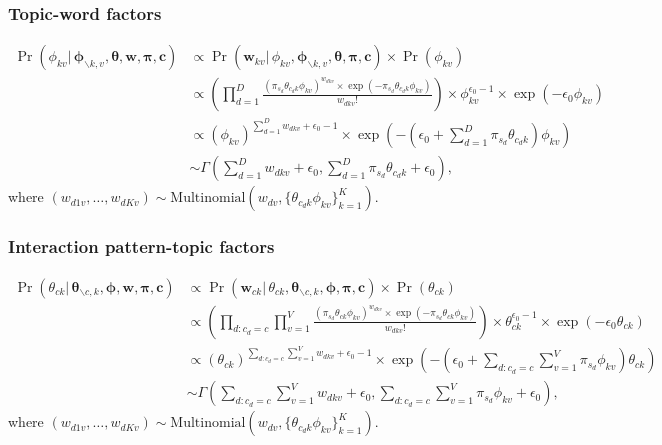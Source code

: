 \documentclass[ba]{imsart}
\numberwithin{equation}{section}
\theoremstyle{plain}
\begin{document}
				\subsubsection{Topic-word factors}
				\begin{equation}
				\begin{aligned}
				\Pr(\phi_{kv}|\,\boldsymbol{\phi}_{\backslash k,v},\boldsymbol{\theta},\boldsymbol{w},\boldsymbol{\pi},\boldsymbol{c}) & \propto \Pr(\boldsymbol{w}_{kv}|\,\phi_{kv},\boldsymbol{\phi}_{\backslash k,v},\boldsymbol{\theta},\boldsymbol{\pi},\boldsymbol{c}) \times \Pr(\phi_{kv})\\
				& \propto (\prod_{d=1}^D \frac{(\pi_{s_d} \theta_{c_dk}\phi_{kv})^{w_{dkv}}\times \exp(-\pi_{s_d} \theta_{c_dk}\phi_{kv})}{w_{dkv}!} )\times \phi_{kv}^{\epsilon_0-1} \times \exp(-\epsilon_0 \phi_{kv})\\
				&\propto (\phi_{kv})^{\sum_{d=1}^D w_{dkv}+\epsilon_0-1}\times \exp(-(\epsilon_0 +\sum_{d=1}^D\pi_{s_d} \theta_{c_dk})\phi_{kv})\\
				&	\sim \Gamma(\sum_{d=1}^D w_{dkv}+\epsilon_0, \sum_{d=1}^D\pi_{s_d} \theta_{c_dk}+\epsilon_0),
				\end{aligned}	
				\end{equation}
				where $(w_{d1v},\ldots,w_{dKv}) \sim \mbox{Multinomial}(w_{dv}, \{ \theta_{c_dk}\phi_{kv}\}_{k=1}^K)$.
	\subsubsection{Interaction pattern-topic factors}
				\begin{equation}
				\begin{aligned}
				\Pr(\theta_{ck}|\,\boldsymbol{\theta}_{\backslash c,k},\boldsymbol{\phi},\boldsymbol{w},\boldsymbol{\pi},\boldsymbol{c}) & \propto \Pr(\boldsymbol{w}_{ck}|\,\theta_{ck},\boldsymbol{\theta}_{\backslash c,k},\boldsymbol{\phi},\boldsymbol{\pi},\boldsymbol{c}) \times \Pr(\theta_{ck})\\
				& \propto (\prod_{d:c_d=c}\prod_{v=1}^V \frac{(\pi_{s_d} \theta_{ck}\phi_{kv})^{w_{dkv}}\times \exp(-\pi_{s_d} \theta_{ck}\phi_{kv})}{w_{dkv}!} )\times \theta_{ck}^{\epsilon_0-1} \times \exp(-\epsilon_0 \theta_{ck})\\
				&\propto (\theta_{ck})^{\sum_{d:c_d=c}\sum_{v=1}^V w_{dkv}+\epsilon_0-1}\times \exp(-(\epsilon_0 +\sum_{d:c_d=c}\sum_{v=1}^V\pi_{s_d} \phi_{kv})\theta_{ck})\\
				&	\sim \Gamma(\sum_{d:c_d=c}\sum_{v=1}^V w_{dkv}+\epsilon_0, \sum_{d:c_d=c}\sum_{v=1}^V\pi_{s_d} \phi_{kv}+\epsilon_0),
				\end{aligned}	
				\end{equation}
				where $(w_{d1v},\ldots,w_{dKv}) \sim \mbox{Multinomial}(w_{dv}, \{ \theta_{c_dk}\phi_{kv}\}_{k=1}^K)$.					
\end{document}
